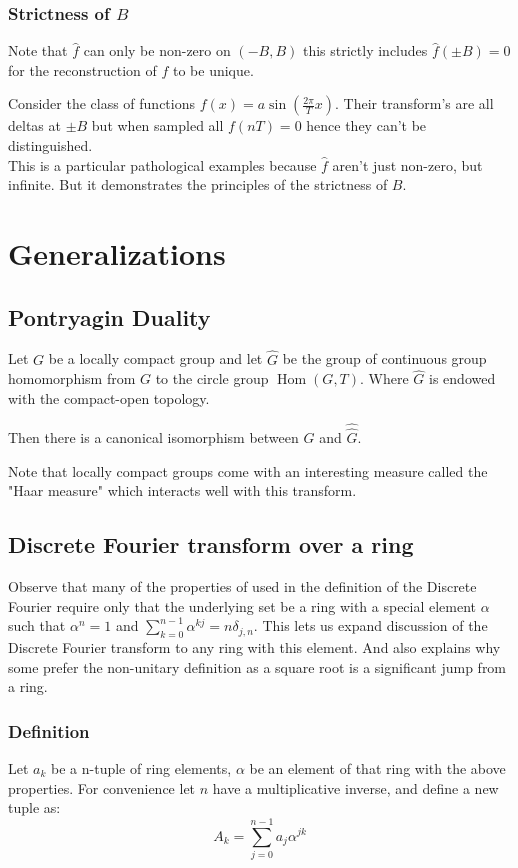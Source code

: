 \documentclass[12pt]{report}
\DeclareMathOperator{\Hom}{Hom}
\begin{document}
\subsection{Strictness of $B$}
Note that $\hat{f}$ can only be non-zero on $(-B,B)$ this strictly includes $\hat{f}(\pm B) = 0$ for the reconstruction of $f$ to be unique.

Consider the class of functions $f(x) = a\sin\left(\frac{2\pi}{T}x\right)$.
Their transform's are all deltas at $\pm B$ but when sampled all $f(nT) = 0$ hence they can't be distinguished.
\\

This is a particular pathological examples because $\hat{f}$ aren't just non-zero, but infinite. 
But it demonstrates the principles of the strictness of $B$.

\chapter{Generalizations}
\section{Pontryagin Duality}
Let $G$ be a locally compact group and let $\hat{G}$ be the group of continuous group homomorphism from $G$ to the circle group $\Hom(G,T)$. Where $\hat{G}$ is endowed with the compact-open topology.

Then there is a canonical isomorphism between $G$ and $\hat{\hat{G}}$.

Note that locally compact groups come with an interesting measure called the "Haar measure" which interacts well with this transform.

\section{Discrete Fourier transform over a ring}
\label{sec:ring}
Observe that many of the properties of used in the definition of the Discrete Fourier require only that the underlying set be a ring with a special element $\alpha$ such that $\alpha^n = 1$ and $\sum_{k=0}^{n-1}\alpha^{kj} = n\delta_{j,n}$.
This lets us expand discussion of the Discrete Fourier transform to any ring with this element.
And also explains why some prefer the non-unitary definition as a square root is a significant jump from a ring.

\subsection{Definition}
Let $a_k$ be a n-tuple of ring elements, $\alpha$ be an element of that ring with the above properties. 
For convenience let $n$ have a multiplicative inverse, and define a new tuple as:
\[A_k = \sum_{j=0}^{n-1}a_j\alpha^{jk}\]
\end{document}
